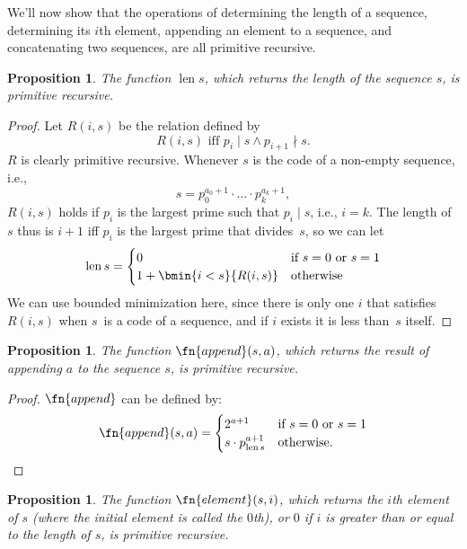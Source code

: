 \documentclass[10pt,a4paper]{article}
\theoremstyle{plain}
\newtheorem{prop}[thm]{Proposition}
\theoremstyle{definition}
\theoremstyle{remark}
\providecommand{\len}{\operatorname{len}}
\begin{document}
We'll now show that the operations of determining the length of a
sequence, determining its $i$th element, appending an element to a
sequence, and concatenating two sequences, are all primitive
recursive.

\begin{prop}
  The function $\len{s}$, which returns the length of the sequence
  $s$, is primitive recursive.
\end{prop}

\begin{proof}
  Let $R(i, s)$ be the relation defined by
  \[
  R(i, s) \text{ iff }
  p_i \mid s \land p_{i+1} \nmid s.
  \]
  $R$ is clearly primitive recursive. Whenever $s$ is the code of a
  non-empty sequence, i.e.,
  \[
  s = p_0^{a_0+1} \cdot \dots \cdot p_{k}^{a_{k}+1},
  \]
  $R(i,s)$ holds if $p_i$ is the largest prime such that
  $p_i \mid s$, i.e., $i = k$. The length of $s$ thus is $i+1$ iff
  $p_i$ is the largest prime that divides~$s$, so we can let
  \[
  \len{s} =
  \begin{cases}
    0 & \text{if $s = 0$ or $s = 1$} \\
    1 + \bmin{i < s}{R(i, s)} & \text{otherwise}
  \end{cases}
  \]
  We can use bounded minimization here, since there is only one $i$ that
  satisfies $R(i,s)$ when $s$~is a code of a sequence, and if $i$
  exists it is less than~$s$ itself.
\end{proof}

\begin{prop}
  The function $\fn{append}(s,a)$, which returns the result of appending $a$ to
  the sequence $s$, is primitive recursive.
\end{prop}

\begin{proof}
  $\fn{append}$ can be defined by:
  \[
  \fn{append}(s,a) =
  \begin{cases}
    2^{a+1} & \text{if $s = 0$ or $s = 1$} \\
    s \cdot p_{\len{s}}^{a+1} & \text{otherwise.}
  \end{cases}
  \]
\end{proof}

\begin{prop}
  The function $\fn{element}(s,i)$, which returns the $i$th element of $s$
  (where the initial element is called the $0$th), or $0$ if $i$ is
  greater than or equal to the length of $s$, is primitive recursive.
\end{prop}
\end{document}
